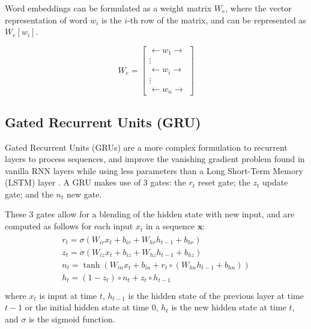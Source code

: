 \documentclass[twoside,twocolumn]{article}
\renewcommand{\vec}[1]{\mathbf{#1}}
\begin{document}
Word embeddings can be formulated as a weight matrix $W_e$, where the
vector representation of word $w_i$ is the $i$-th row of the matrix, and
can be represented as $W_e[w_i]$.

\begin{equation}
  W_e = \begin{bmatrix}
  \longleftarrow w_1 \longrightarrow \\
  \vdots\\
  \longleftarrow w_i \longrightarrow\\
  \vdots\\
  \longleftarrow w_n \longrightarrow
\end{bmatrix}
\end{equation}

\subsection{Gated Recurrent Units (GRU)}
\label{sec:gru}

Gated Recurrent Units (GRUs) are a more complex formulation to recurrent layers
to process sequences, and improve the vanishing gradient problem found in
vanilla RNN layers while using less parameters than a Long Short-Term Memory
(LSTM) layer \cite{cho2014learning}. A GRU makes use of 3 gates: the $r_t$ reset gate;
the $z_t$ update gate; and the $n_t$ new gate.

These 3 gates allow for a blending of the hidden state with new input,
and are computed as follows for each input $x_t$ in a sequence $\vec{x}$:
\begin{equation}
  \begin{split}\begin{array}{ll}
  r_t = \sigma(W_{ir} x_t + b_{ir} + W_{hr} h_{t-1} + b_{hr}) \\
  z_t = \sigma(W_{iz} x_t + b_{iz} + W_{hz} h_{t-1} + b_{hz}) \\
  n_t = \tanh(W_{in} x_t + b_{in} + r_t \circ (W_{hn} h_{t-1}+ b_{hn})) \\
  h_t = (1 - z_t) \circ n_t + z_t \circ h_{t-1} \\
  \end{array}\end{split}
\end{equation}
where $x_t$ is input at time $t$, $h_{t-1}$ is the hidden state of the
previous layer at time $t-1$ or the initial hidden state at time $0$, $h_t$
is the new hidden state at time $t$, and $\sigma$ is the sigmoid function.
\end{document}
